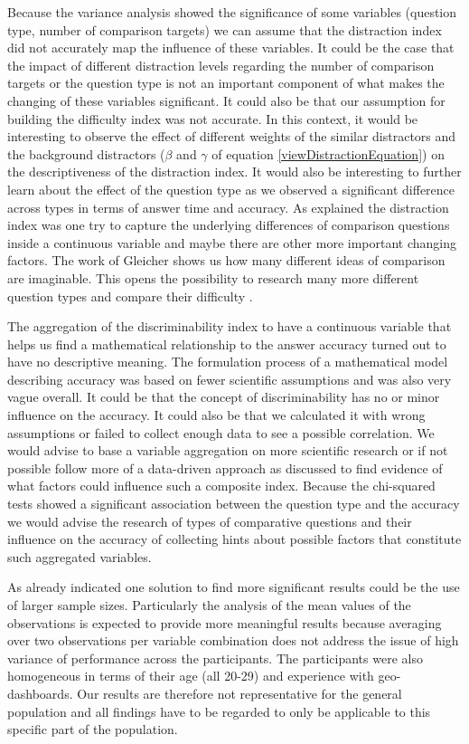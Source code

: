 Because the variance analysis showed the significance of some variables (question type, number of comparison targets)
we can assume that the distraction index did not accurately map the influence of these variables. It could be the case that the impact of different distraction levels regarding
the number of comparison targets or the question type is not an important component of what makes the changing of these variables significant. It could also be that our assumption
for building the difficulty index was not accurate. In this context, it would be interesting to observe the effect of different weights of the similar distractors and the background
distractors ($\beta$ and $\gamma$ of equation \ref{viewDistractionEquation}) on the descriptiveness of the distraction index. It would also be interesting to further learn about the
effect of the question type as we observed a significant difference across types in terms of answer time and accuracy. As explained the distraction index was one try to capture the underlying
differences of comparison questions inside a continuous variable and maybe there are other more important changing factors. The work of Gleicher shows us how many different ideas of comparison 
are imaginable. This opens the possibility to research many more different question types and compare their difficulty \citep*{Gleicher.2018}.

The aggregation of the discriminability index to have a continuous variable that helps us find a mathematical relationship to the answer accuracy
turned out to have no descriptive meaning. The formulation process of a mathematical model describing accuracy was based on fewer scientific assumptions and was also
very vague overall. It could be that the concept of discriminability has no or minor influence on the accuracy. It could also be that we calculated it with wrong
assumptions or failed to collect enough data to see a possible correlation. We would advise to base a variable aggregation on more scientific research or
if not possible follow more of a data-driven approach as discussed to find evidence of what factors could influence such a composite index.
Because the chi-squared tests showed a significant association between the question type and the accuracy we would advise the research of types of comparative questions
and their influence on the accuracy of collecting hints about possible factors that constitute such aggregated variables.

As already indicated one solution to find more significant results could be the use of larger sample sizes. Particularly the analysis of the mean values of the observations is expected to provide more meaningful
results because averaging over two observations per variable combination does not address the issue of high variance of performance across the participants.
The participants were also homogeneous in terms of their age (all 20-29) and experience with geo-dashboards. Our results are therefore not representative
for the general population and all findings have to be regarded to only be applicable to this specific part of the population.


